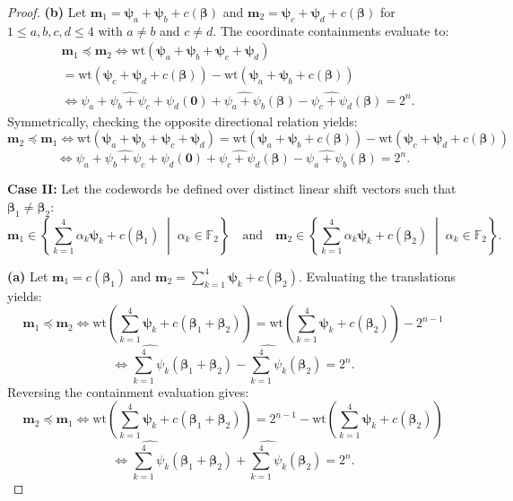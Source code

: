 \documentclass[pdflatex,sn-mathphys-num]{sn-jnl}%
\theoremstyle{thmstyleone}%
\theoremstyle{thmstyletwo}%
\theoremstyle{thmstylethree}%
\begin{document}
\begin{proof}
\textbf{(b)} Let $\mathbf{m}_1 = \mathbf{\psi}_a + \mathbf{\psi}_b + c(\mathbf{\beta})$ and $\mathbf{m}_2 = \mathbf{\psi}_c + \mathbf{\psi}_d + c(\mathbf{\beta})$ for $1 \le a,b,c,d \le 4$ with $a \neq b$ and $c \neq d$. The coordinate containments evaluate to:
\begin{align*}
&\mathbf{m}_1 \preceq \mathbf{m}_2 \Leftrightarrow 
\mathrm{wt}(\mathbf{\psi}_a + \mathbf{\psi}_b + \mathbf{\psi}_c + \mathbf{\psi}_d) \\
&= \mathrm{wt}(\mathbf{\psi}_c + \mathbf{\psi}_d + c(\mathbf{\beta})) - \mathrm{wt}(\mathbf{\psi}_a + \mathbf{\psi}_b + c(\mathbf{\beta}))\\
&\Leftrightarrow \widehat{\psi_a + \psi_b + \psi_c + \psi_d}(\mathbf{0}) + \widehat{\psi_a + \psi_b}(\mathbf{\beta}) - \widehat{\psi_c + \psi_d}(\mathbf{\beta}) = 2^n.
\end{align*}
Symmetrically, checking the opposite directional relation yields:
\[
\mathbf{m}_2 \preceq \mathbf{m}_1 \Leftrightarrow 
\mathrm{wt}(\mathbf{\psi}_a + \mathbf{\psi}_b + \mathbf{\psi}_c + \mathbf{\psi}_d) 
= \mathrm{wt}(\mathbf{\psi}_a + \mathbf{\psi}_b + c(\mathbf{\beta})) - \mathrm{wt}(\mathbf{\psi}_c + \mathbf{\psi}_d + c(\mathbf{\beta}))
\]
\[
\Leftrightarrow \widehat{\psi_a + \psi_b + \psi_c + \psi_d}(\mathbf{0}) + \widehat{\psi_c + \psi_d}(\mathbf{\beta}) - \widehat{\psi_a + \psi_b}(\mathbf{\beta}) = 2^n.
\]

\textbf{Case II:} Let the codewords be defined over distinct linear shift vectors such that $\mathbf{\beta}_1 \neq \mathbf{\beta}_2$:
\[
\mathbf{m}_1 \in \left\{\sum_{k=1}^{4} \alpha_k \mathbf{\psi}_k + c(\mathbf{\beta}_1) \;\middle|\; \alpha_k \in \mathbb{F}_2 \right\} \quad \text{and} \quad \mathbf{m}_2 \in \left\{\sum_{k=1}^{4} \alpha_k \mathbf{\psi}_k + c(\mathbf{\beta}_2) \;\middle|\; \alpha_k \in \mathbb{F}_2 \right\}.
\]

\textbf{(a)} Let $\mathbf{m}_1 = c(\mathbf{\beta}_1)$ and $\mathbf{m}_2 = \sum_{k=1}^{4} \mathbf{\psi}_k + c(\mathbf{\beta}_2)$. Evaluating the translations yields:
\[
\mathbf{m}_1 \preceq \mathbf{m}_2 \Leftrightarrow 
\mathrm{wt}\!\left(\sum_{k=1}^{4} \mathbf{\psi}_k + c(\mathbf{\beta}_1 + \mathbf{\beta}_2)\right)
= \mathrm{wt}\!\left(\sum_{k=1}^{4} \mathbf{\psi}_k + c(\mathbf{\beta}_2)\right) - 2^{n-1}
\]
\[
\Leftrightarrow \widehat{\sum_{k=1}^{4} \psi_k}(\mathbf{\beta}_1 + \mathbf{\beta}_2) - \widehat{\sum_{k=1}^{4} \psi_k}(\mathbf{\beta}_2) = 2^n.
\]
Reversing the containment evaluation gives:
\[
\mathbf{m}_2 \preceq \mathbf{m}_1 \Leftrightarrow 
\mathrm{wt}\!\left(\sum_{k=1}^{4} \mathbf{\psi}_k + c(\mathbf{\beta}_1 + \mathbf{\beta}_2)\right)
= 2^{n-1} - \mathrm{wt}\!\left(\sum_{k=1}^{4} \mathbf{\psi}_k + c(\mathbf{\beta}_2)\right)
\]
\[
\Leftrightarrow \widehat{\sum_{k=1}^{4} \psi_k}(\mathbf{\beta}_1 + \mathbf{\beta}_2) + \widehat{\sum_{k=1}^{4} \psi_k}(\mathbf{\beta}_2) = 2^n.
\]


\end{proof}
\end{document}
